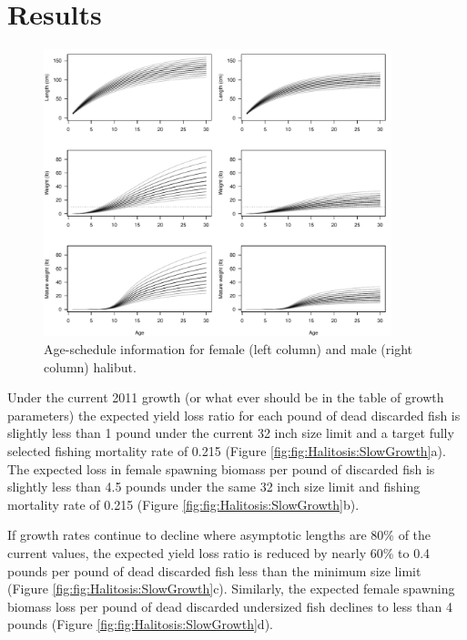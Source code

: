 \documentclass[12pt]{article}
\begin{document}
\section{Results} %
\label{sec:results}

\begin{figure}[htbp]
	\centering
		\includegraphics[width=0.9\textwidth]{Halibut:AgeSchedules.pdf}
	\caption{Age-schedule information for female (left column) and male (right column) halibut.}
	\label{fig:Halibut.AgeSchedules}
\end{figure}


Under the current 2011 growth (or what ever should be in the table of growth parameters) the expected yield loss ratio for each pound of dead discarded fish is slightly less than 1 pound under the current 32 inch size limit and a target fully selected fishing mortality rate of 0.215 (Figure \ref{fig:fig:Halitosis:SlowGrowth}a).  The expected loss in female spawning biomass per pound of discarded fish is slightly less than 4.5 pounds under the same 32 inch size limit and fishing mortality rate of 0.215 (Figure \ref{fig:fig:Halitosis:SlowGrowth}b).

If growth rates continue to decline where asymptotic lengths are 80\% of the current values, the expected yield loss ratio is reduced by nearly 60\% to 0.4 pounds per pound of dead discarded fish less than the minimum size limit (Figure \ref{fig:fig:Halitosis:SlowGrowth}c).  Similarly, the expected female spawning biomass loss per pound of dead discarded undersized fish declines to less than 4 pounds (Figure \ref{fig:fig:Halitosis:SlowGrowth}d).
\end{document}

